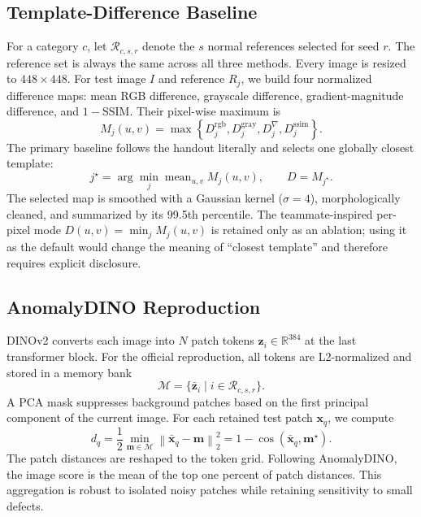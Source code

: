 \subsection{Template-Difference Baseline}
For a category $c$, let $\mathcal{R}_{c,s,r}$ denote the $s$ normal references
selected for seed $r$. The reference set is always the same across all three
methods. Every image is resized to $448\times448$. For test image $I$ and
reference $R_j$, we build four normalized difference maps: mean RGB
difference, grayscale difference, gradient-magnitude difference, and
$1-\mathrm{SSIM}$. Their pixel-wise maximum is
\begin{equation}
M_j(u,v)=\max\left\{D^{\mathrm{rgb}}_j,D^{\mathrm{gray}}_j,
D^{\nabla}_j,D^{\mathrm{ssim}}_j\right\}.
\end{equation}
The primary baseline follows the handout literally and selects one globally
closest template:
\begin{equation}
j^\star=\arg\min_j \operatorname{mean}_{u,v}M_j(u,v),\qquad D=M_{j^\star}.
\end{equation}
The selected map is smoothed with a Gaussian kernel ($\sigma=4$),
morphologically cleaned, and summarized by its 99.5th percentile. The
teammate-inspired per-pixel mode $D(u,v)=\min_j M_j(u,v)$ is retained only as
an ablation; using it as the default would change the meaning of ``closest
template'' and therefore requires explicit disclosure.

\subsection{AnomalyDINO Reproduction}
DINOv2 converts each image into $N$ patch tokens
$\mathbf{z}_i\in\mathbb{R}^{384}$ at the last transformer block. For the
official reproduction, all tokens are L2-normalized and stored in a memory bank
\begin{equation}
\mathcal{M}=\{\bar{\mathbf{z}}_i \mid i\in\mathcal{R}_{c,s,r}\}.
\end{equation}
A PCA mask suppresses background patches based on the first principal component
of the current image. For each retained test patch $\mathbf{x}_q$, we compute
\begin{equation}
d_q=\frac{1}{2}\min_{\mathbf{m}\in\mathcal{M}}
\left\|\bar{\mathbf{x}}_q-\mathbf{m}\right\|_2^2
=1-\cos\!\left(\bar{\mathbf{x}}_q,\mathbf{m}^\star\right).
\end{equation}
The patch distances are reshaped to the token grid. Following AnomalyDINO, the
image score is the mean of the top one percent of patch distances. This
aggregation is robust to isolated noisy patches while retaining sensitivity to
small defects.

